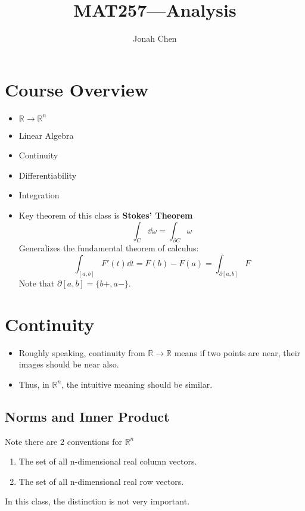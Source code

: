 \documentclass[a4paper]{article}
\title{MAT257---Analysis}
\author{Jonah Chen}
\numberwithin{equation}{section}
\begin{document}
\maketitle
\tableofcontents
\section{Course Overview}
\begin{itemize}
    \item $\mathbb R\to\mathbb R^n$
    \item Linear Algebra
    \item Continuity
    \item Differentiability
    \item Integration
    \item Key theorem of this class is \textbf{Stokes' Theorem}
    \begin{equation}
        \int_C\dd\omega=\int_{\partial C}\omega
    \end{equation}
    Generalizes the fundamental theorem of calculus:
    \begin{equation}
        \int_{[a,b]}F'(t)\dd t=F(b)-F(a)=\int_{\partial[a,b]}F
    \end{equation}
    Note that $\partial[a,b]=\{b+, a-\}$.
\end{itemize}

\section{Continuity}
\begin{itemize}
    \item Roughly speaking, continuity from $\mathbb R\to\mathbb R$ means if two points are near, their images should be near also.
    \item Thus, in $\mathbb R^n$, the intuitive meaning should be similar.
\end{itemize}
\subsection{Norms and Inner Product}
Note there are 2 conventions for $\mathbb R^n$
\begin{enumerate}
    \item The set of all n-dimensional real column vectors.
    \item The set of all n-dimensional real row vectors.
\end{enumerate}
In this class, the distinction is not very important.
\end{document}
